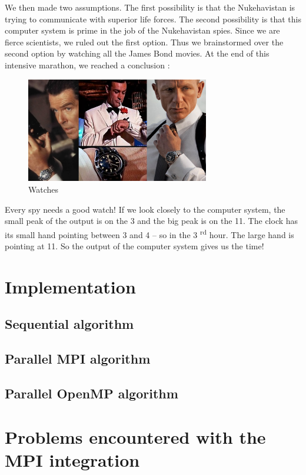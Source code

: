 \documentclass[11pt,a4paper]{article}
\begin{document}
We then made two assumptions. The first possibility is that the Nukehavistan is trying to communicate with superior life forces. The second possibility is that this computer system is prime in the job of the Nukehavistan spies. Since we are fierce scientists, we ruled out the first option. Thus we brainstormed over the second option by watching all the James Bond movies. At the end of this intensive marathon, we reached a conclusion :

\begin{figure}[!h]
\centering
\includegraphics[width=8cm]{watches.png}
\caption{Watches}
\label{reverse}
\end{figure}

Every spy needs a good watch! If we look closely to the computer system, the small peak of the output is on the 3 and the big peak is on the 11. The clock has its small hand pointing between 3 and 4 -- so in the 3 \textsuperscript{rd} hour. The large hand is pointing at 11. So the output of the computer system gives us the time!

\section{Implementation}

\subsection{Sequential algorithm}

\subsection{Parallel MPI algorithm}

\subsection{Parallel OpenMP algorithm}

\newpage

\appendix
\section*{Problems encountered with the MPI integration}
\end{document}
